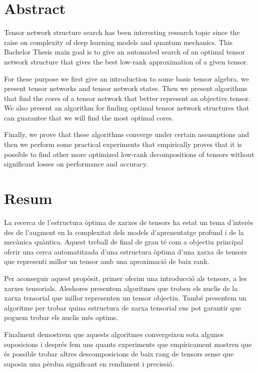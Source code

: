 \documentclass[11pt,a4paper,openright,oneside]{book}
\numberwithin{equation}{section}
\begin{document}
\newpage
{} 

\section*{Abstract}

Tensor network structure search has been interesting research topic since the raise on
complexity of deep learning models and quantum mechanics. This Bachelor Thesis main goal is to give an 
automated search of an optimal tensor network structure that gives the best low-rank approximation of a given 
tensor.

For these purpose we first give an introduction to some basic tensor algebra, we present tensor networks and tensor
network states. Then we present algorithms that find the cores of a tensor network that better represent an objective tensor.
We also present an algorithm for finding optimal tensor network structures that can guarantee that we will find
the most optimal cores.

Finally, we prove that these algorithms converge under certain assumptions and then we perform
some practical experiments that empirically proves that it is possible to find other more optimized low-rank decompositions of tensors
without significant losses on performance and accuracy.

\section*{Resum}

La recerca de l'estructura òptima de xarxes de tensors ha estat un tema d'interès des de l'augment en la complexitat dels models d'aprenentatge profund i de la mecànica quàntica. 
Aquest treball de final de grau té com a objectiu principal oferir una cerca automatitzada 
d’una estructura òptima d'una xarxa de tensors que representi millor un tensor amb una aproximació de baix rank.

Per aconseguir aquest propòsit, primer oferim una introducció als tensors, a les xarxes tensorials. 
Aleshores presentem algoritmes que troben els nuclis de la xarxa tensorial que millor representen un tensor objectiu.
També presentem un algoritme per trobar quina estructura de xarxa tensorial ens pot garantir que poguem trobar els nuclis més optims.

Finalment demostrem que aquests algoritmes convergeixen sota algunes suposicions i després fem
uns quants experiments que empíricament mostren que és possible trobar altres descomposicions de baix rang de tensors
sense que suposin una pèrdua significant en rendiment i precissió.
\end{document}
